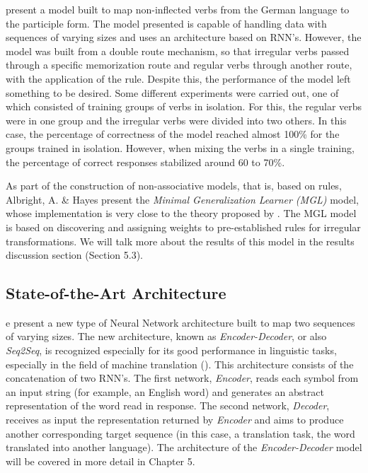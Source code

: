 \cite{wetermann:1997} present a model built to map non-inflected verbs from the German language to the participle form. The model presented is capable of handling data with sequences of varying sizes and uses an architecture based on RNN's. However, the model was built from a double route mechanism, so that irregular verbs passed through a specific memorization route and regular verbs through another route, with the application of the rule. Despite this, the performance of the model left something to be desired. Some different experiments were carried out, one of which consisted of training groups of verbs in isolation. For this, the regular verbs were in one group and the irregular verbs were divided into two others. In this case, the percentage of correctness of the model reached almost 100\% for the groups trained in isolation. However, when mixing the verbs in a single training, the percentage of correct responses stabilized around 60 to 70\%.

As part of the construction of non-associative models, that is, based on rules, Albright, A. \& Hayes present the \textit{Minimal Generalization Learner (MGL)} model, whose implementation is very close to the theory proposed by \cite{Pinker:1988}. The MGL model is based on discovering and assigning weights to pre-established rules for irregular transformations. We will talk more about the results of this model in the results discussion section (Section 5.3).

\subsection{State-of-the-Art Architecture}

\cite{enc-dec:2014} e \cite{seq2seq:2014} present a new type of Neural Network architecture built to map two sequences of varying sizes. The new architecture, known as \textit{Encoder-Decoder}, or also \textit{Seq2Seq}, is recognized especially for its good performance in linguistic tasks, especially in the field of machine translation (\cite{Wu:2016}). This architecture consists of the concatenation of two RNN's. The first network, \textit{Encoder}, reads each symbol from an input string (for example, an English word) and generates an abstract representation of the word read in response. The second network, \textit{Decoder}, receives as input the representation returned by \textit{Encoder} and aims to produce another corresponding target sequence (in this case, a translation task, the word translated into another language). The architecture of the \textit{Encoder-Decoder} model will be covered in more detail in Chapter 5.

